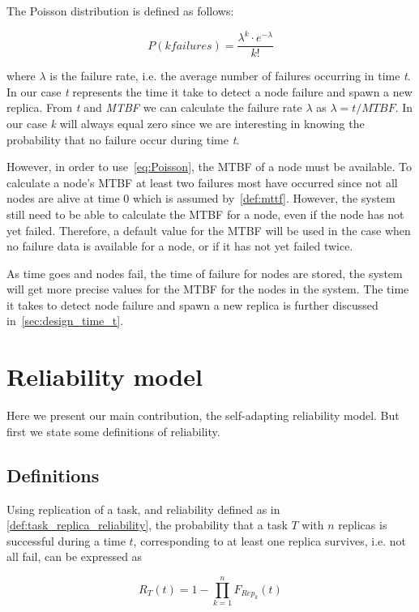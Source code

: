 \documentclass{cslthse-msc}
\begin{document}
The Poisson distribution is defined as follows:

\begin{equation} \label{eq:Poisson}
P(k failures) = \dfrac{\lambda^k \cdot e^{-\lambda}}{k!}
\end{equation}

where $\lambda$ is the failure rate, i.e. the average number of failures occurring in time \emph{t}. In our case \emph{t} represents the time it take to detect a node failure and spawn a new replica. From \emph{t} and \emph{MTBF} we can calculate the failure rate $\lambda$ as $\lambda = t/MTBF$. In our case \emph{k} will always equal zero since we are interesting in knowing the probability that no failure occur during time \emph{t}. 

However, in order to use~\cref{eq:Poisson}, the MTBF of a node must be available. To calculate a node's MTBF at least two failures most have occurred since not all nodes are alive at time 0 which is assumed by~\cref{def:mttf}. However, the system still need to be able to calculate the MTBF for a node, even if the node has not yet failed. Therefore, a default value for the MTBF will be used in the case when no failure data is available for a node, or if it has not yet failed twice.

As time goes and nodes fail, the time of failure for nodes are stored, the system will get more precise values for the MTBF for the nodes in the system. The time it takes to detect node failure and spawn a new replica is further discussed in~\cref{sec:design_time_t}.

\section{Reliability model} \label{sec:design_reliability_model}
Here we present our main contribution, the self-adapting reliability model. But first we state some definitions of reliability.

\subsection{Definitions} \label{subsec:design_definitions}
Using replication of a task, and reliability defined as in \cref{def:task_replica_reliability}, the probability that a task $T$ with $n$ replicas is successful during a time $t$, corresponding to at least one replica survives, i.e. not all fail, can be expressed as 

\begin{equation} \label{eq:task_reliability}
R_{T}(t) =  1 - \prod\limits_{k=1}^n F_{Rep_k}(t)
\end{equation}
\end{document}
